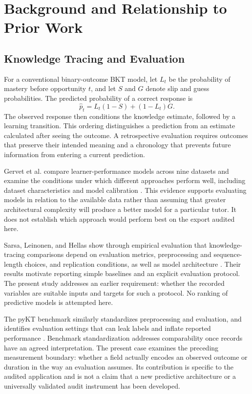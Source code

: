\documentclass[conference]{IEEEtran}
\begin{document}
\section{Background and Relationship to Prior Work}
\subsection{Knowledge Tracing and Evaluation}
For a conventional binary-outcome BKT model, let $L_t$ be the probability of mastery before opportunity $t$, and let $S$ and $G$ denote slip and guess probabilities. The predicted probability of a correct response is
\begin{equation}
\widehat{p}_t=L_t(1-S)+(1-L_t)G.
\label{eq:prediction}
\end{equation}
The observed response then conditions the knowledge estimate, followed by a learning transition. This ordering distinguishes a prediction from an estimate calculated after seeing the outcome. A retrospective evaluation requires outcomes that preserve their intended meaning and a chronology that prevents future information from entering a current prediction.

Gervet et al. compare learner-performance models across nine datasets and examine the conditions under which different approaches perform well, including dataset characteristics and model calibration \cite{gervet2020}. This evidence supports evaluating models in relation to the available data rather than assuming that greater architectural complexity will produce a better model for a particular tutor. It does not establish which approach would perform best on the export audited here.

Sarsa, Leinonen, and Hellas show through empirical evaluation that knowledge-tracing comparisons depend on evaluation metrics, preprocessing and sequence-length choices, and replication conditions, as well as model architecture \cite{sarsa2022}. Their results motivate reporting simple baselines and an explicit evaluation protocol. The present study addresses an earlier requirement: whether the recorded variables are suitable inputs and targets for such a protocol. No ranking of predictive models is attempted here.

The pyKT benchmark similarly standardizes preprocessing and evaluation, and identifies evaluation settings that can leak labels and inflate reported performance \cite{liu2022pykt}. Benchmark standardization addresses comparability once records have an agreed interpretation. The present case examines the preceding measurement boundary: whether a field actually encodes an observed outcome or duration in the way an evaluation assumes. Its contribution is specific to the audited application and is not a claim that a new predictive architecture or a universally validated audit instrument has been developed.
\end{document}
